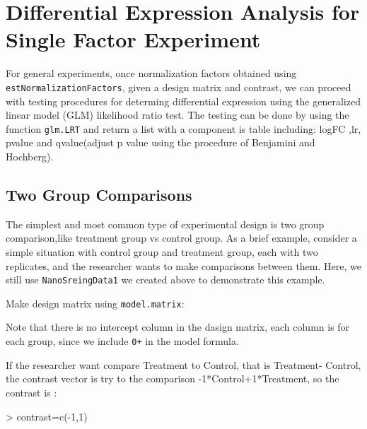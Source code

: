 \documentclass[12pt]{article}
\begin{document}
\section{Differential Expression Analysis for Single Factor Experiment}


For general experiments, once normalization factors obtained using 
{\tt estNormalizationFactors}, given a design matrix and contrast,
we can proceed with testing procedures for determing differential 
expression using the generalized linear model (GLM) likelihood ratio 
test. The testing can be done by using the function {\tt glm.LRT} and
return a list with a component is table including: logFC ,lr, pvalue
and qvalue(adjust p value using the procedure of Benjamini and Hochberg).


\subsection{Two Group Comparisons}

The simplest and most common type of experimental design is two group 
comparison,like treatment group vs control group. As a brief example,
consider a simple situation with control group and  treatment group, 
each with two replicates, and the researcher wants to make comparisons
between them. Here, we still use {\tt NanoSreingData1} we created above
to demonstrate this example.


Make design matrix using {\tt model.matrix}:
\begin{Schunk}
\end{Schunk}
Note that there is no intercept column in the dasign matrix, each column is 
for each group, since we include {\tt 0+} in the model formula.


If the researcher want compare Treatment to Control, that is Treatment- Control,
the contrast vector is try to the comparison -1*Control+1*Treatment, so the 
contrast is :

\begin{Schunk}
\begin{Sinput}
> contrast=c(-1,1)
\end{Sinput}
\end{Schunk}
\end{document}
